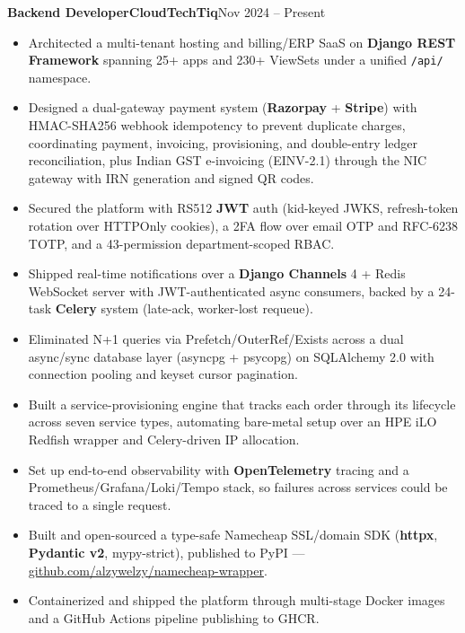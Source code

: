 \documentclass[11pt,a4paper]{article}
\newcommand{\entry}[3]{%
  \vspace{4.5pt}\noindent\textbf{#1}\hfill\textbf{#2}\hfill{\color{subtlegray}#3}\par\vspace{2pt}}
\begin{document}
\entry{Backend Developer}{CloudTechTiq}{Nov 2024 -- Present}
\begin{itemize}
  \item Architected a multi-tenant hosting and billing/ERP SaaS on \textbf{Django
        REST Framework} spanning 25+ apps and 230+ ViewSets under a unified
        \texttt{/api/} namespace.
  \item Designed a dual-gateway payment system (\textbf{Razorpay} +
        \textbf{Stripe}) with HMAC-SHA256 webhook idempotency to prevent duplicate
        charges, coordinating payment, invoicing, provisioning, and double-entry
        ledger reconciliation, plus Indian GST e-invoicing (EINV-2.1) through the
        NIC gateway with IRN generation and signed QR codes.
  \item Secured the platform with RS512 \textbf{JWT} auth (kid-keyed JWKS,
        refresh-token rotation over HTTPOnly cookies), a 2FA flow over email OTP
        and RFC-6238 TOTP, and a 43-permission department-scoped RBAC.
  \item Shipped real-time notifications over a \textbf{Django Channels} 4 + Redis
        WebSocket server with JWT-authenticated async consumers, backed by a
        24-task \textbf{Celery} system (late-ack, worker-lost requeue).
  \item Eliminated N+1 queries via Prefetch/OuterRef/Exists across a dual
        async/sync database layer (asyncpg + psycopg) on SQLAlchemy 2.0 with
        connection pooling and keyset cursor pagination.
  \item Built a service-provisioning engine that tracks each order through its
        lifecycle across seven service types, automating bare-metal setup over an
        HPE iLO Redfish wrapper and Celery-driven IP allocation.
  \item Set up end-to-end observability with \textbf{OpenTelemetry} tracing and a
        Prometheus/Grafana/Loki/Tempo stack, so failures across services could be
        traced to a single request.
  \item Built and open-sourced a type-safe Namecheap SSL/domain SDK
        (\textbf{httpx}, \textbf{Pydantic v2}, mypy-strict), published to PyPI ---
        \href{https://github.com/alzywelzy/namecheap-wrapper}{github.com/alzywelzy/namecheap-wrapper}.
  \item Containerized and shipped the platform through multi-stage Docker images
        and a GitHub Actions pipeline publishing to GHCR.
\end{itemize}
\end{document}
